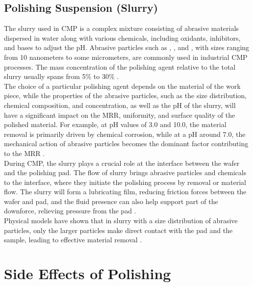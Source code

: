 \subsection{Polishing Suspension (Slurry)}
\label{subsec:polishing_slurry}

The slurry used in CMP is a complex mixture consisting of abrasive materials dispersed in water along with various chemicals, including oxidants, inhibitors, and bases to adjust the pH. Abrasive particles such as , , and , with sizes ranging from 10 nanometers to some micrometers, are commonly used in industrial CMP processes. The mass concentration of the polishing agent relative to the total slurry usually spans from 5\% to 30\% \cite{bliedtnerOptiktechnologieGrundlagenVerfahrenAnwendungenBeispieleOptical2010}.
\\
The choice of a particular polishing agent depends on the material of the work piece, while the properties of the abrasive particles, such as the size distribution, chemical composition, and concentration, as well as the pH of the slurry, will have a significant impact on the MRR, uniformity, and surface quality of the polished material. For example, at pH values of 3.0 and 10.0, the material removal is primarily driven by chemical corrosion, while at a pH around 7.0, the mechanical action of abrasive particles becomes the dominant factor contributing to the MRR \cite{liang-yongEffectChemicalsChemical2007}.
\\
During CMP, the slurry plays a crucial role at the interface between the wafer and the polishing pad. The flow of slurry brings abrasive particles and chemicals to the interface, where they initiate the polishing process by removal or material flow. The slurry will form a lubricating film, reducing friction forces between the wafer and pad, and the fluid presence can also help support part of the downforce, relieving pressure from the pad \cite{zhaoChemicalMechanicalPolishing2013}.
\\
Physical models have shown that in slurry with a size distribution of abrasive particles, only the larger particles make direct contact with the pad and the sample, leading to effective material removal \cite{liang-yongEffectChemicalsChemical2007}. 

\section{Side Effects of Polishing}
\label{sec:polishing_side_eff}

